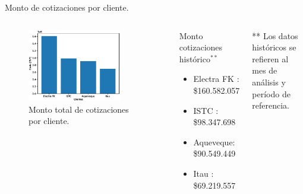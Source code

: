\documentclass[aspectratio=169,xcolor=dvipsnames]{beamer}
\begin{document}
\begin{frame}{Monto de cotizaciones por cliente.}

\begin{columns}[c]
\begin{figure}
     \includegraphics[width=0.8\textwidth]{EPS/cliente_monto_total.eps}
     \caption{Monto total de cotizaciones por cliente.}
     \label{graph:monto_max_cliente}
\end{figure}

\begin{block}{Monto cotizaciones histórico$^{**}$}
\begin{itemize}
    \item  Electra FK : \$160.582.057
    \item  ISTC : \$98.347.698
    \item  Aqueveque: \$90.549.449
    \item  Itau : \$69.219.557    
\end{itemize}
\end{block}
\begin{block}{}
    \tiny{** Los datos históricos se refieren al mes de análisis y período de referencia.}
\end{block}

\end{columns}
    
\end{frame}
\end{document}

